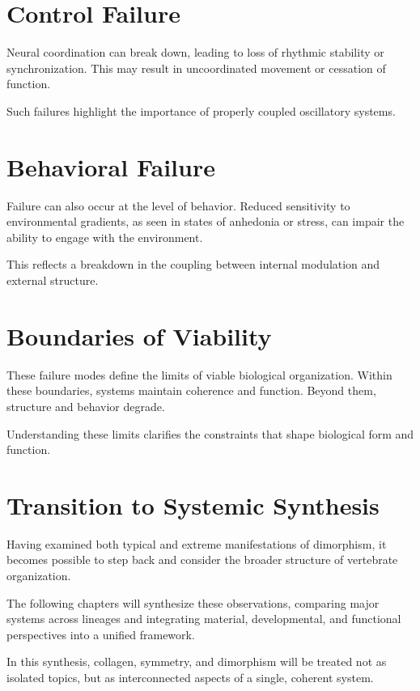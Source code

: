 \documentclass[11pt,oneside]{book}
\begin{document}
\section{Control Failure}

Neural coordination can break down, leading to loss of rhythmic stability or synchronization. This may result in uncoordinated movement or cessation of function.

Such failures highlight the importance of properly coupled oscillatory systems.

\section{Behavioral Failure}

Failure can also occur at the level of behavior. Reduced sensitivity to environmental gradients, as seen in states of anhedonia or stress, can impair the ability to engage with the environment.

This reflects a breakdown in the coupling between internal modulation and external structure.

\section{Boundaries of Viability}

These failure modes define the limits of viable biological organization. Within these boundaries, systems maintain coherence and function. Beyond them, structure and behavior degrade.

Understanding these limits clarifies the constraints that shape biological form and function.

\section{Transition to Systemic Synthesis}

Having examined both typical and extreme manifestations of dimorphism, it becomes possible to step back and consider the broader structure of vertebrate organization.

The following chapters will synthesize these observations, comparing major systems across lineages and integrating material, developmental, and functional perspectives into a unified framework.

In this synthesis, collagen, symmetry, and dimorphism will be treated not as isolated topics, but as interconnected aspects of a single, coherent system.
\end{document}
